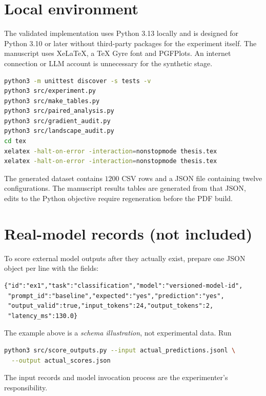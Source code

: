 \documentclass[12pt,a4paper,oneside]{report}
\begin{document}
\section{Local environment}
The validated implementation uses Python 3.13 locally and is designed for Python 3.10 or later without third-party packages for the experiment itself. The manuscript uses XeLaTeX, a TeX Gyre font and PGFPlots. An internet connection or LLM account is unnecessary for the synthetic stage.
\begin{lstlisting}[language=bash]
python3 -m unittest discover -s tests -v
python3 src/experiment.py
python3 src/make_tables.py
python3 src/paired_analysis.py
python3 src/gradient_audit.py
python3 src/landscape_audit.py
cd tex
xelatex -halt-on-error -interaction=nonstopmode thesis.tex
xelatex -halt-on-error -interaction=nonstopmode thesis.tex
\end{lstlisting}
The generated dataset contains $1200$ CSV rows and a JSON file containing twelve configurations. The manuscript results tables are generated from that JSON, edits to the Python objective require regeneration before the PDF build.

\section{Real-model records (not included)}
To score external model outputs after they actually exist, prepare one JSON object per line with the fields:\par
\begin{lstlisting}
{"id":"ex1","task":"classification","model":"versioned-model-id",
 "prompt_id":"baseline","expected":"yes","prediction":"yes",
 "output_valid":true,"input_tokens":24,"output_tokens":2,
 "latency_ms":130.0}
\end{lstlisting}
The example above is a \emph{schema illustration}, not experimental data. Run
\begin{lstlisting}[language=bash]
python3 src/score_outputs.py --input actual_predictions.jsonl \
  --output actual_scores.json
\end{lstlisting}
The input records and model invocation process are the experimenter's responsibility.


\end{document}
